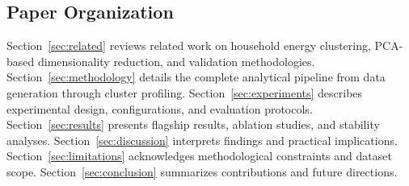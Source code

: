 \subsection{Paper Organization}

Section~\ref{sec:related} reviews related work on household energy clustering, PCA-based dimensionality reduction, and validation methodologies. Section~\ref{sec:methodology} details the complete analytical pipeline from data generation through cluster profiling. Section~\ref{sec:experiments} describes experimental design, configurations, and evaluation protocols. Section~\ref{sec:results} presents flagship results, ablation studies, and stability analyses. Section~\ref{sec:discussion} interprets findings and practical implications. Section~\ref{sec:limitations} acknowledges methodological constraints and dataset scope. Section~\ref{sec:conclusion} summarizes contributions and future directions.
